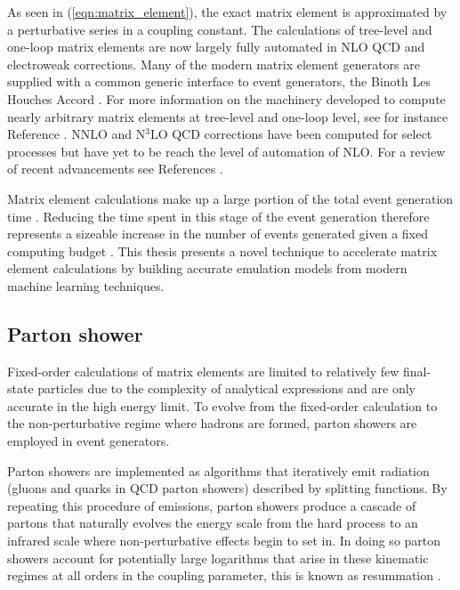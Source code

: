 \documentclass[main.tex]{subfiles}
\begin{document}
    As seen in (\ref{eqn:matrix_element}),
    the exact matrix element is approximated by a perturbative
    series in a coupling constant. The calculations of
    tree-level \cite{Mangano:2002ea,Krauss:2001iv,Gleisberg:2008fv,Cafarella:2007pc,Alwall:2011uj,Kilian:2007gr}
    and one-loop \cite{Berger:2008sj,Cullen:2011ac,Cullen:2014yla,Bevilacqua:2011xh,Hirschi:2011pa,Alwall:2014hca,Frederix:2018nkq,Campbell:1999ah,Campbell:2021vlt,Badger:2012pg,Cascioli:2011va,Buccioni:2019sur,Actis:2016mpe,Denner:2017wsf}
    matrix elements are now largely fully automated
    in NLO QCD and electroweak corrections.
    Many of the modern matrix element generators are supplied
    with a common generic interface to event generators,
    the Binoth Les Houches Accord \cite{Binoth:2010xt,Alioli:2013nda}.
    For more information on the machinery developed to
    compute nearly arbitrary matrix elements at tree-level and
    one-loop level, see for instance Reference \cite{Campbell:2017hsr}.
    NNLO and N$^{3}$LO QCD corrections have been computed
    for select processes but have yet to be reach the
    level of automation of NLO.
    For a review of recent advancements see References \cite{Caola:2022ayt,Campbell:2022qmc}.
    
    Matrix element calculations make up a large
    portion of the total event generation time \cite{Bothmann:2022thx}.
    Reducing the time spent in this stage of the event
    generation therefore represents a sizeable increase
    in the number of events generated given a fixed computing
    budget \cite{HSFPhysicsEventGeneratorWG:2020gxw}.
    This thesis presents a novel technique to
    accelerate matrix element calculations by building
    accurate emulation models from modern machine learning
    techniques.

    \subsection*{Parton shower}\label{sec:parton_showers}
    Fixed-order calculations of matrix elements are limited
    to relatively few final-state particles due to the complexity
    of analytical expressions and are only accurate in the
    high energy limit. To evolve from the fixed-order
    calculation to the non-perturbative regime where hadrons
    are formed, parton showers are employed in event generators.

    Parton showers are implemented as algorithms that
    iteratively emit radiation (gluons and quarks in QCD
    parton showers) described by splitting functions.
    By repeating this procedure of emissions, parton
    showers produce a cascade of partons that naturally
    evolves the energy scale from the hard process to
    an infrared scale where non-perturbative effects
    begin to set in. In doing so parton showers account
    for potentially large logarithms that arise in
    these kinematic regimes at all orders in the coupling
    parameter, this is known as resummation \cite{Buckley:2011ms}.
\end{document}
